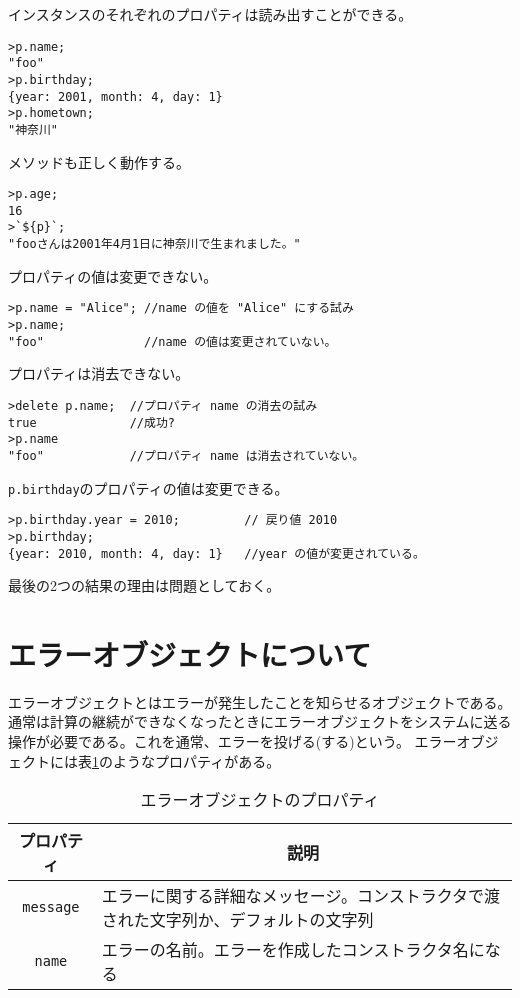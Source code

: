 \begin{Exec}
インスタンスのそれぞれのプロパティは読み出すことができる。
\begin{Verbatim}
>p.name;
"foo"
>p.birthday;
{year: 2001, month: 4, day: 1}
>p.hometown;
"神奈川"
\end{Verbatim}
 メソッドも正しく動作する。
\begin{Verbatim}
>p.age;
16
>`${p}`;
"fooさんは2001年4月1日に神奈川で生まれました。"
\end{Verbatim}
プロパティの値は変更できない。
\begin{Verbatim}
>p.name = "Alice"; //name の値を "Alice" にする試み
>p.name;
"foo"              //name の値は変更されていない。
\end{Verbatim}
プロパティは消去できない。
\begin{Verbatim}
>delete p.name;  //プロパティ name の消去の試み
true             //成功?
>p.name
"foo"            //プロパティ name は消去されていない。
\end{Verbatim}
 \texttt{p.birthday}のプロパティの値は変更できる。
\begin{Verbatim}
>p.birthday.year = 2010;         // 戻り値 2010
>p.birthday;
{year: 2010, month: 4, day: 1}   //year の値が変更されている。
\end{Verbatim}
最後の2つの結果の理由は問題としておく。
\end{Exec}

 \section{エラーオブジェクトについて}
エラーオブジェクトとはエラーが発生したことを知らせるオブジェクトである。
通常は計算の継続ができなくなったときにエラーオブジェクトをシステムに送る
操作が必要である。これを通常、エラーを投げる(する)という。
エラーオブジェクトには表\ref{ErrorProp}のようなプロパティがある。
\begin{table}[ht]
 \caption{エラーオブジェクトのプロパティ}\label{ErrorProp}
 \begin{center}
	 \begin{tabular}{|c|m{}|}\hline
		プロパティ&\multicolumn{1}{c|}{説明}\\ \hline
		\texttt{message}&エラーに関する詳細なメッセージ。コンストラクタで渡
				された文字列か、デフォルトの文字列\\ \hline
		\texttt{name}&エラーの名前。エラーを作成したコンストラクタ名になる\\ \hline

	\end{tabular}
 \end{center}
\end{table}
